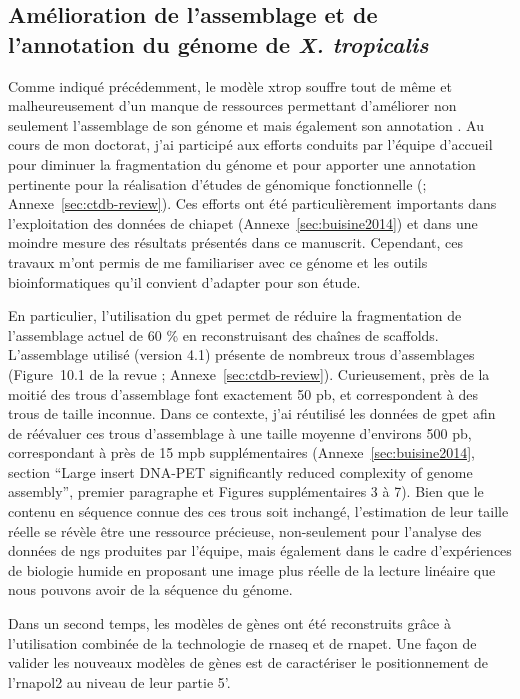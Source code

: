 \documentclass[../main.tex]{subfiles}
\begin{document}
	\subsection{Amélioration de l'assemblage et de l'annotation du génome de \textit{X. tropicalis}}
		Comme indiqué précédemment, le modèle \gls{xtrop} souffre tout de même et malheureusement d'un manque de ressources permettant d'améliorer non seulement l'assemblage de son génome et mais également son annotation \citep{Gilchrist2012}.
		Au cours de mon doctorat, j'ai participé aux efforts conduits par l'équipe d'accueil pour diminuer la fragmentation du génome et pour apporter une annotation pertinente pour la réalisation d'études de génomique fonctionnelle (\citealp{Grimaldi2013}; Annexe~\ref{sec:ctdb-review}).
		Ces efforts ont été particulièrement importants dans l'exploitation des données de \gls{chiapet} (Annexe~\ref{sec:buisine2014}) et dans une moindre mesure des résultats présentés dans ce manuscrit.
		Cependant, ces travaux m'ont permis de me familiariser avec ce génome et les outils bioinformatiques qu'il convient d'adapter pour son étude.
		\par
		En particulier, l'utilisation du \gls{gpet} permet de réduire la fragmentation de l'assemblage actuel de 60 \% en reconstruisant des chaînes de scaffolds.
		L'assemblage utilisé (version 4.1) présente de nombreux trous d'assemblages (Figure~10.1 de la revue \citealp{Grimaldi2013}; Annexe~\ref{sec:ctdb-review}).
		Curieusement, près de la moitié des trous d'assemblage font exactement 50 \gls{pb}, et correspondent à des trous de taille inconnue.
		Dans ce contexte, j'ai réutilisé les données de \gls{gpet} afin de réévaluer ces trous d'assemblage à une taille moyenne d'environs 500 \gls{pb}, correspondant à près de 15 \gls{mpb} supplémentaires (Annexe~\ref{sec:buisine2014}, section ``Large insert DNA-PET significantly reduced complexity of genome assembly'', premier paragraphe et Figures supplémentaires 3 à 7).
		Bien que le contenu en séquence connue des ces trous soit inchangé, l'estimation de leur taille réelle se révèle être une ressource précieuse, non-seulement pour l'analyse des données de \gls{ngs} produites par l'équipe, mais également dans le cadre d'expériences de biologie humide en proposant une image plus réelle de la lecture linéaire que nous pouvons avoir de la séquence du génome.
		\par
		Dans un second temps, les modèles de gènes ont été reconstruits grâce à l'utilisation combinée de la technologie de \gls{rnaseq} et de \gls{rnapet}.
		Une façon de valider les nouveaux modèles de gènes est de caractériser le positionnement de l'\gls{rnapol2} au niveau de leur partie 5'.
\end{document}
